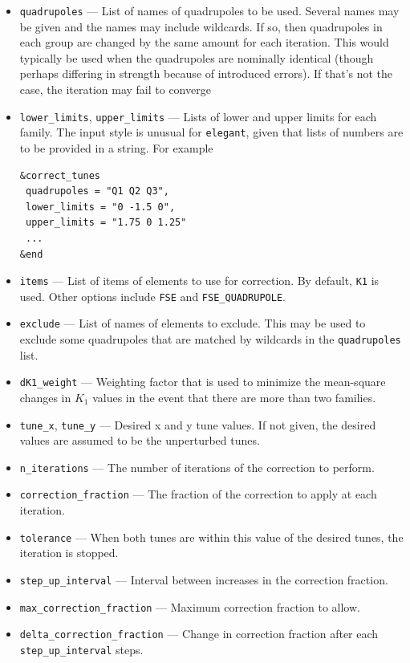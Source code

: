 \documentclass[11pt]{article}
\begin{document}
\begin{itemize}
\item \verb|quadrupoles| --- List of names of quadrupoles to be used.  Several names may be given and the names may include
  wildcards. If so, then quadrupoles in each group are changed by the same amount for each iteration.
  This would typically be used when the quadrupoles are nominally identical (though perhaps differing in strength because of
  introduced errors). If that's not the case, the iteration may fail to converge
\item \verb|lower_limits|, \verb|upper_limits| --- Lists of lower and upper limits for each family. The input style is
  unusual for {\tt elegant}, given that lists of numbers are to be provided in a string. For example
\begin{verbatim}
&correct_tunes
 quadrupoles = "Q1 Q2 Q3",
 lower_limits = "0 -1.5 0",
 upper_limits = "1.75 0 1.25"
 ...
&end
\end{verbatim}
\item \verb|items| --- List of items of elements to use for correction. By default, \verb|K1| is used. Other options
  include \verb|FSE| and \verb|FSE_QUADRUPOLE|.
\item \verb|exclude| --- List of names of elements to exclude. This may be used to exclude some 
  quadrupoles that are matched by wildcards in the \verb|quadrupoles| list.
\item \verb|dK1_weight| --- Weighting factor that is used to minimize the mean-square changes in $K_1$ values in the
  event that there are more than two families.
\item \verb|tune_x|, \verb|tune_y| --- Desired x and y tune values.  If not given, the desired values are
assumed to be the unperturbed tunes.
\item \verb|n_iterations| --- The number of iterations of the correction to perform.
\item \verb|correction_fraction| --- The fraction of the correction to apply at each iteration.
\item \verb|tolerance| --- When both tunes are within this value of the desired tunes, the
iteration is stopped.
\item \verb|step_up_interval| --- Interval between increases in the correction fraction.
\item \verb|max_correction_fraction| --- Maximum correction fraction to allow.
\item \verb|delta_correction_fraction| --- Change in correction fraction after 
each \verb|step_up_interval| steps.

\end{itemize}
\end{document}
